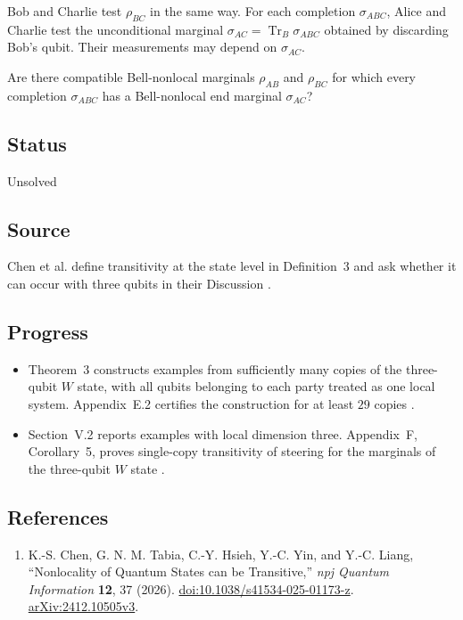 Bob and Charlie test $\rho_{BC}$ in the same way. For each completion $\sigma_{ABC}$, Alice and Charlie test the unconditional marginal $\sigma_{AC}=\operatorname{Tr}_B\sigma_{ABC}$ obtained by discarding Bob's qubit. Their measurements may depend on $\sigma_{AC}$.

Are there compatible Bell-nonlocal marginals $\rho_{AB}$ and $\rho_{BC}$ for which every completion $\sigma_{ABC}$ has a Bell-nonlocal end marginal $\sigma_{AC}$?

\subsection*{Status}

Unsolved

\subsection*{Source}

Chen et al. define transitivity at the state level in Definition~3 and ask whether it can occur with three qubits in their Discussion .

\subsection*{Progress}

\begin{itemize}
  \item Theorem~3 constructs examples from sufficiently many copies of the three-qubit $W$ state, with all qubits belonging to each party treated as one local system. Appendix~E.2 certifies the construction for at least $29$ copies .

  \item Section~V.2 reports examples with local dimension three. Appendix~F, Corollary~5, proves single-copy transitivity of steering for the marginals of the three-qubit $W$ state .
\end{itemize}

\subsection*{References}

\begin{enumerate}[label={},leftmargin=4.8em,labelsep=0.5em]
  \footnotesize
  \item[\textup{[CTH+26]}]\label{ref:d8-01-cth-26}
  K.-S. Chen, G. N. M. Tabia, C.-Y. Hsieh, Y.-C. Yin, and Y.-C. Liang, ``Nonlocality of Quantum States can be Transitive,'' \emph{npj Quantum Information} \textbf{12}, 37 (2026). \href{https://doi.org/10.1038/s41534-025-01173-z}{doi:10.1038/s41534-025-01173-z}. \href{https://arxiv.org/abs/2412.10505v3}{arXiv:2412.10505v3}.
\end{enumerate}

